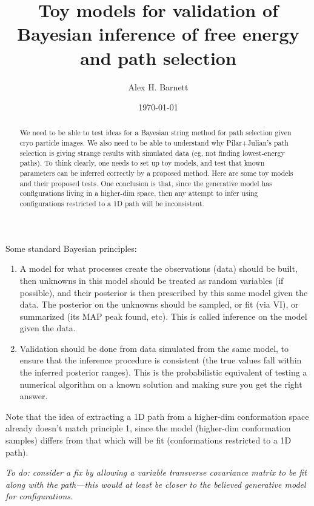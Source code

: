 \documentclass[10pt]{article}
\newcommand{\ben}{\begin{enumerate}}
\newcommand{\een}{\end{enumerate}}
\begin{document}
\title{Toy models for validation of Bayesian inference of free energy and path selection}

\author{Alex H. Barnett}
\date{\today}
\maketitle

\begin{abstract}
  We need to be able to test ideas for a Bayesian string method for path selection given cryo particle images.
  We also need to be able to understand why Pilar+Julian's path selection is giving strange results with simulated data (eg, not finding lowest-energy paths).
  To think clearly, one needs to set up toy models, and test that known
  parameters can be inferred correctly by a proposed method.
  Here are some toy models and their proposed tests.
  One conclusion is that, since the generative model has configurations living
  in a higher-dim space, then any attempt to infer using configurations
  restricted to a 1D path will be inconsistent.
\end{abstract}

Some standard Bayesian principles:
\ben
\item
A model for what processes create the observations (data)
should be built, then unknowns in this model should be treated as
random variables (if possible), and their posterior is then
prescribed by this same model given the data. The posterior on the unknowns
should be sampled, or fit (via VI), or summarized (its MAP peak found, etc).
This is called inference on the model given the data.
\item
Validation should be done from data simulated from the same model,
to ensure that the inference procedure is consistent (the true values
fall within the inferred posterior ranges). This is the
probabilistic
equivalent of testing a numerical algorithm on a known solution and
making sure you get the right answer.
\een

Note that the idea of extracting a 1D path from a higher-dim conformation
space
already doesn't match principle 1, since the model (higher-dim conformation samples)
differs from that which will be fit (conformations restricted to a 1D path).

{\em To do: consider a fix by allowing a variable transverse covariance matrix to
be fit along with the path---this would at least be closer to the believed generative model for configurations.}
\end{document}
